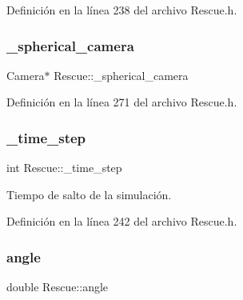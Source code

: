 Definición en la línea 238 del archivo Rescue.\+h.

\mbox{\label{classRescue_a6f2788baf7717274fc75241b989796bc_a6f2788baf7717274fc75241b989796bc}} 
\subsubsection{\texorpdfstring{\+\_\+spherical\+\_\+camera}{\_spherical\_camera}}
{\footnotesize\ttfamily Camera$\ast$ Rescue\+::\+\_\+spherical\+\_\+camera\hspace{0.3cm}{\ttfamily [private]}}



Definición en la línea 271 del archivo Rescue.\+h.

\mbox{\label{classRescue_abbc48e2cca3b2acf36b530e5070f1756_abbc48e2cca3b2acf36b530e5070f1756}} 
\subsubsection{\texorpdfstring{\+\_\+time\+\_\+step}{\_time\_step}}
{\footnotesize\ttfamily int Rescue\+::\+\_\+time\+\_\+step\hspace{0.3cm}{\ttfamily [private]}}



Tiempo de salto de la simulación. 



Definición en la línea 242 del archivo Rescue.\+h.

\mbox{\label{classRescue_a5bb8010f938dbe020a183b486772afe4_a5bb8010f938dbe020a183b486772afe4}} 
\subsubsection{\texorpdfstring{angle}{angle}}
{\footnotesize\ttfamily double Rescue\+::angle\hspace{0.3cm}{\ttfamily [private]}}



